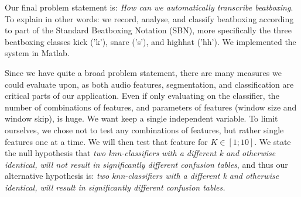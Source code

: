 Our final problem statement is: \textit{How can we automatically transcribe beatboxing}. To explain in other words: we record, analyse, and classify beatboxing according to part of the Standard Beatboxing Notation (SBN), more specifically the three beatboxing classes kick ('k'), snare ('s'), and highhat ('hh'). We implemented the system in Matlab.

Since we have quite a broad problem statement, there are many measures we could evaluate upon, as both audio features, segmentation, and classification are critical parts of our application. Even if only evaluating on the classifier, the number of combinations of features, and parameters of features (window size and window skip), is huge. We want keep a single independent variable. To limit ourselves, we chose not to test any combinations of features, but rather single features one at a time. We will then test that feature for $K \in [1;10]$. We state the null hypothesis that \emph{two knn-classifiers with a different k and otherwise identical, will not result in significantly different confusion tables}, and thus our alternative hypothesis is: \emph{two knn-classifiers with a different k and otherwise identical, will result in significantly different confusion tables.}

